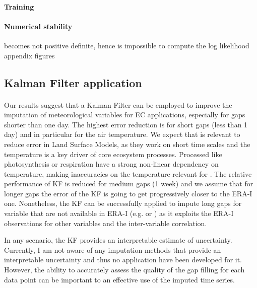\documentclass{article}
\let\Oldsubsection\subsection
\renewcommand{\subsection}{\FloatBarrier\Oldsubsection}
\begin{document}
\paragraph{Training}

\paragraph{Numerical stability} becomes not positive definite, hence is impossible to compute the log likelihood
appendix figures

\subsection{Kalman Filter application}

\paragraph{} Our results suggest that a Kalman Filter can be employed to improve the imputation of meteorological variables for EC applications, especially for gaps shorter than one day. 
The highest error reduction is for short gaps (less than 1 day) and  in particular for the air temperature. We expect that is relevant to reduce error in Land Surface Models, as they work on short time scales and the temperature is a key driver of core ecosystem processes. Processed like photosynthesis or respiration have a strong non-linear dependency on temperature, making inaccuracies on the temperature relevant for  \cite{bonan_climate_2019-2}.
The relative performance of KF is reduced for medium gaps (1 week) and we assume that for longer gaps the error of the KF is going to get progressively closer to the ERA-I one. Nonetheless, the KF can be successfully applied to impute long gaps for variable that are not available in ERA-I (e.g.  or ) as it exploits the ERA-I observations for other variables and the inter-variable correlation.

In any scenario, the KF provides an interpretable estimate of uncertainty. Currently, I am not aware of any imputation methods that provide an interpretable uncertainty and thus no application have been developed for it. However, the ability to accurately assess the quality of the gap filling for each data point can be important to an effective use of the imputed time series.
\end{document}
